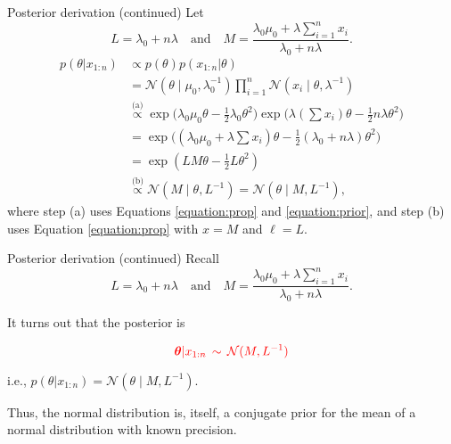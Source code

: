\documentclass[
  ignorenonframetext,
]{beamer}
\newcommand{\btheta}{{\bm\theta}}
\newcommand{\N}{\mathcal{N}}
\begin{document}
\begin{frame}{Posterior derivation (continued)}
\protect\hypertarget{posterior-derivation-continued-1}{}
Let \[L =\lambda_0+ n\lambda \quad \text{and} \quad
M =\frac{\lambda_0\mu_0+\lambda\sum_{i = 1}^n x_i}{\lambda_0+ n\lambda}.\]
\begin{align*}
p(\theta|x_{1:n})&\propto p(\theta) p(x_{1:n}|\theta) \\
&= \N(\theta\mid\mu_0,\lambda_0^{-1})\prod_{i = 1}^n\N(x_i\mid \theta,\lambda^{-1})\\
&\overset{\text{(a)}}{\propto} \exp\big(\lambda_0\mu_0\theta-\tfrac{1}{2}\lambda_0\theta^2\big)
         \exp\big(\lambda (\textstyle\sum x_i) \theta -\tfrac{1}{2}n\lambda\theta^2\big)\\
&= \exp\Big((\lambda_0\mu_0+\lambda\textstyle\sum x_i)\theta-\tfrac{1}{2}(\lambda_0+ n\lambda)\theta^2\Big)\\
&= \exp(L M\theta-\tfrac{1}{2}L\theta^2)\\
&\overset{\text{(b)}}{\propto} \N(M\mid\theta,L^{-1}) =\N(\theta\mid M,L^{-1}),
\end{align*} where step (a) uses Equations \ref{equation:prop} and
\ref{equation:prior}, and step (b) uses Equation \ref{equation:prop}
with \(x=M\) and \(\ell=L\).
\end{frame}

\begin{frame}{Posterior derivation (continued)}
\protect\hypertarget{posterior-derivation-continued-2}{}
Recall \[L =\lambda_0+ n\lambda \quad \text{and} \quad
M =\frac{\lambda_0\mu_0+\lambda\sum_{i = 1}^n x_i}{\lambda_0+ n\lambda}.\]

It turns out that the posterior is

\begin{equation}
\label{equation:posterior}
\textcolor{red}{\btheta|x_{1:n}\, \sim \,\N(M,L^{-1})}
\end{equation}

i.e., \(p(\theta|x_{1:n}) =\N(\theta\mid M,L^{-1})\).

Thus, the normal distribution is, itself, a conjugate prior for the mean
of a normal distribution with known precision.
\end{frame}
\end{document}
